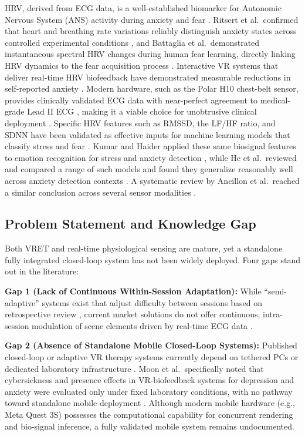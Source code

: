 \documentclass[conference]{IEEEtran}
\begin{document}
HRV, derived from ECG data, is a well-established biomarker for Autonomic Nervous System (ANS) activity during anxiety and fear \cite{tsai2025,nummenmaa2014}. Ritsert et al.\ confirmed that heart and breathing rate variations reliably distinguish anxiety states across controlled experimental conditions \cite{ritsert2022}, and Battaglia et al.\ demonstrated instantaneous spectral HRV changes during human fear learning, directly linking HRV dynamics to the fear acquisition process \cite{battaglia2020}. Interactive VR systems that deliver real-time HRV biofeedback have demonstrated measurable reductions in self-reported anxiety \cite{xu2025}. Modern hardware, such as the Polar H10 chest-belt sensor, provides clinically validated ECG data with near-perfect agreement to medical-grade Lead II ECG \cite{chung2026}, making it a viable choice for unobtrusive clinical deployment \cite{skala2022}. Specific HRV features such as RMSSD, the LF/HF ratio, and SDNN have been validated as effective inputs for machine learning models that classify stress and fear \cite{tsai2025,sajno2023,esc1996}. Kumar and Haider applied these same biosignal features to emotion recognition for stress and anxiety detection \cite{kumar2025}, while He et al.\ reviewed and compared a range of such models and found they generalize reasonably well across anxiety detection contexts \cite{he2025}. A systematic review by Ancillon et al.\ reached a similar conclusion across several sensor modalities \cite{ancillon2022}.

\subsection{Problem Statement and Knowledge Gap}

Both VRET and real-time physiological sensing are mature, yet a standalone fully integrated closed-loop system has not been widely deployed. Four gaps stand out in the literature:

\textbf{Gap 1 (Lack of Continuous Within-Session Adaptation):} While ``semi-adaptive'' systems exist that adjust difficulty between sessions based on retrospective review \cite{leong2025}, current market solutions do not offer continuous, intra-session modulation of scene elements driven by real-time ECG data \cite{leong2025,orozco2024}.

\textbf{Gap 2 (Absence of Standalone Mobile Closed-Loop Systems):} Published closed-loop or adaptive VR therapy systems currently depend on tethered PCs or dedicated laboratory infrastructure \cite{orozco2024,mevlevio2024,vet2025}. Moon et al.\ specifically noted that cybersickness and presence effects in VR-biofeedback systems for depression and anxiety were evaluated only under fixed laboratory conditions, with no pathway toward standalone mobile deployment \cite{moon2025}. Although modern mobile hardware (e.g., Meta Quest 3S) possesses the computational capability for concurrent rendering and bio-signal inference, a fully validated mobile system remains undocumented.
\end{document}

